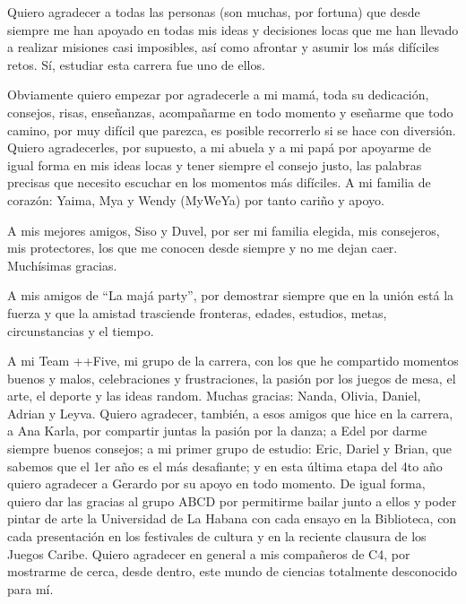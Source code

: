 \begin{acknowledgements}
Quiero agradecer a todas las personas (son muchas, por fortuna) que desde siempre me han apoyado en todas mis ideas y decisiones locas que me han llevado a realizar misiones casi imposibles, as\'i como afrontar y asumir los m\'as dif\'iciles retos. S\'i, estudiar esta carrera fue uno de ellos.

Obviamente quiero empezar por agradecerle a mi mam\'a, toda su dedicaci\'on, consejos, risas, ense\~nanzas, acompa\~narme en todo momento y ese\~narme que todo camino, por muy dif\'icil que parezca, es posible recorrerlo si se hace con diversi\'on. Quiero agradecerles, por supuesto, a mi abuela y a mi pap\'a por apoyarme de igual forma en mis ideas locas y tener siempre el consejo justo, las palabras precisas que necesito escuchar en los momentos m\'as dif\'iciles. A mi familia de coraz\'on: Yaima, Mya y Wendy (MyWeYa) por tanto cari\~no y apoyo.

A mis mejores amigos, Siso y Duvel, por ser mi familia elegida, mis consejeros, mis protectores, los que me conocen desde siempre y no me dejan caer. Much\'isimas gracias.

A mis amigos de ``La maj\'a party'', por demostrar siempre que en la uni\'on est\'a la fuerza y que la amistad trasciende fronteras, edades, estudios, metas, circunstancias y el tiempo.

A mi Team ++Five, mi grupo de la carrera, con los que he compartido momentos buenos y malos, celebraciones y frustraciones, la pasi\'on por los juegos de mesa, el arte, el deporte y las ideas random. Muchas gracias: Nanda, Olivia, Daniel, Adrian y Leyva. Quiero agradecer, tambi\'en, a esos amigos que hice en la carrera, a Ana Karla, por compartir juntas la pasi\'on por la danza; a Edel por darme siempre buenos consejos; a mi primer grupo de estudio: Eric, Dariel y Brian, que sabemos que el 1er a\~no es el m\'as desafiante; y en esta \'ultima etapa del 4to a\~no quiero agradecer a Gerardo por su apoyo en todo momento. De igual forma, quiero dar las gracias al grupo ABCD por permitirme bailar junto a ellos y poder pintar de arte la Universidad de La Habana con cada ensayo en la Biblioteca, con cada presentaci\'on en los festivales de cultura y en la reciente clausura de los Juegos Caribe. Quiero agradecer en general a mis compa\~neros de C4, por mostrarme de cerca, desde dentro, este mundo de ciencias totalmente desconocido para m\'i.


\end{acknowledgements}
